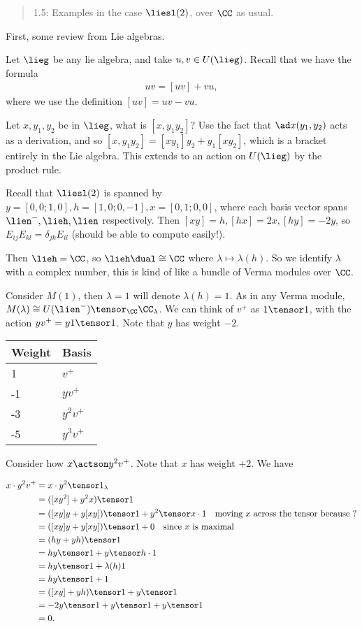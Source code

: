 \begin{quote}
1.5: Examples in the case \(\liesl(2)\), over \(\CC\) as usual.
\end{quote}

First, some review from Lie algebras.

Let \(\lieg\) be any lie algebra, and take \(u, v \in U(\lieg)\). Recall
that we have the formula
\begin{align*}uv = [uv] + vu,\end{align*} where we use the definition
\([uv] = uv - vu\).

Let \(x, y_1, y_2\) be in \(\lieg\), what is \([x, y_1 y_2]\)? Use the
fact that \(\ad x (y_1, y_2)\) acts as a derivation, and so
\([x, y_1 y_2] = [x y_1]y_2 + y_1[x y_2]\), which is a bracket entirely
in the Lie algebra. This extends to an action on \(U(\lieg)\) by the
product rule.

Recall that \(\liesl(2)\) is spanned by
\(y =[0,0; 1,0], h = [1,0; 0, -1], x = [0,1; 0,0]\), where each basis
vector spans \(\lien^-, \lieh, \lien\) respectively. Then
\([x y] = h, [h x] = 2x, [h y] = -2y\), so
\(E_{ij} E_{kl} = \delta_{jk} E_{il}\) (should be able to compute
easily!).

Then \(\lieh = \CC\), so \(\lieh\dual \cong \CC\) where
\(\lambda \mapsto \lambda(h)\). So we identify \(\lambda\) with a
complex number, this is kind of like a bundle of Verma modules over
\(\CC\).

Consider \(M(1)\), then \(\lambda = 1\) will denote \(\lambda(h) = 1\).
As in any Verma module,
\(M(\lambda) \cong U(\lien^-) \tensor_\CC \CC_{\lambda}\). We can think
of \(v^+\) as \(1\tensor 1\), with the action \(yv^+ = y1\tensor 1\).
Note that \(y\) has weight \(-2\).

\begin{longtable}[]{@{}ll@{}}
\toprule
Weight & Basis\tabularnewline
\midrule
\endhead
1 & \(v^+\)\tabularnewline
-1 & \(yv^+\)\tabularnewline
-3 & \(y^2 v^+\)\tabularnewline
-5 & \(y^3 v^+\)\tabularnewline
\bottomrule
\end{longtable}

Consider how \(x\actson y^2 v^+\). Note that \(x\) has weight \(+2\). We
have

\begin{align*}
x \cdot y^2 v^+ 
&= x \cdot y^2 \tensor 1_\lambda \\
&= ([x y^2] + y^2 x) \tensor 1 \\
&= ([xy]y + y[xy]) \tensor 1 + y^2 \tensor x\cdot 1 \quad\text{moving $x$ across the tensor because ?}\\
&= ([xy]y + y[xy]) \tensor 1 + 0  \quad\text{since $x$ is maximal} \\
&= (hy + yh) \tensor 1 \\
&= hy \tensor 1 + y\tensor h\cdot 1 \\
&= hy \tensor 1 + \lambda(h)1 \\
&= hy \tensor 1 + 1 \\
&= ([xy] + yh)\tensor 1 + y\tensor 1 \\
&= -2y \tensor 1 + y\tensor 1 + y\tensor 1 \\
&= 0
.\end{align*}


